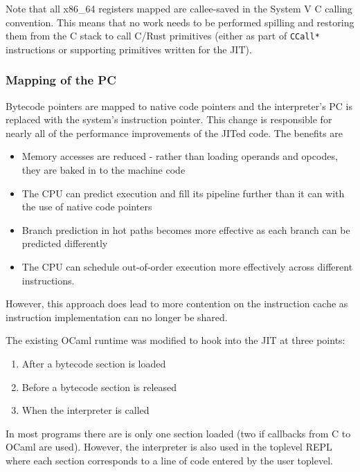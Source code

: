 Note that all x86\_64 registers mapped are callee-saved in the System V C calling convention. This
means that no work needs to be performed spilling and restoring them from the C stack to call
C/Rust
primitives (either as part of \texttt{CCall*} instructions or supporting primitives written for the
JIT).

\subsubsection{Mapping of the PC}

Bytecode pointers are mapped to native code pointers and the interpreter's PC is replaced with the
system's instruction pointer. This change is responsible for nearly all of the performance
improvements of the JITed code. The benefits are

\begin{itemize}
      \item Memory accesses are reduced - rather than loading operands and opcodes, they are baked
            in to the machine code
      \item The CPU can predict execution and fill its pipeline further than it can with the use of
            native code pointers
      \item Branch prediction in hot paths becomes more effective as each branch can be predicted
            differently
      \item The CPU can schedule out-of-order execution more effectively across different
            instructions.
\end{itemize}

However, this approach does lead to more contention on the instruction cache as instruction
implementation can no longer be shared.


The existing OCaml runtime was modified to hook into the JIT at three points:

\begin{enumerate}
      \item After a bytecode section is loaded
      \item Before a bytecode section is released
      \item When the interpreter is called
\end{enumerate}

In most programs there are is only one section loaded (two if callbacks from C to OCaml are
used). However, the interpreter is also used in the toplevel REPL where each section corresponds to
a line of code entered by the user toplevel.

